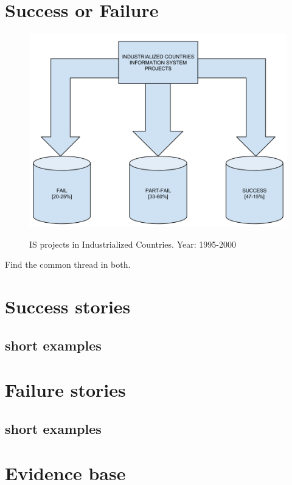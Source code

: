 \section{Success or Failure}

\begin{figure}
\centering
\includegraphics[width=\columnwidth]{literature/ict_in_dev/images/iCountryISProjects(1995-2000).png}
\label{icisp}
\caption{IS projects in Industrialized Countries. Year: 1995-2000 \cite{rh:isdc}}
\end{figure}

Find the common thread in both.

\section{Success stories}
\subsection{short examples}
\section{Failure stories}
\subsection{short examples}

\section{Evidence base}

